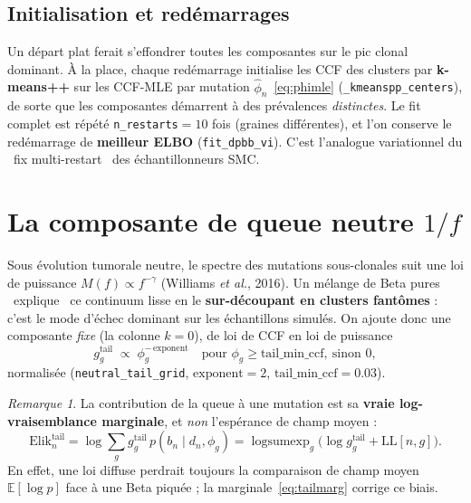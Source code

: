\documentclass[11pt,a4paper]{article}
\providecommand{\og}{\guillemotleft~}
\providecommand{\fg}{~\guillemotright}
\newcommand{\E}{\mathbb{E}}
\newcommand{\lse}{\operatorname{logsumexp}}
\newcommand{\code}[1]{\texttt{#1}}
\theoremstyle{remark}
\newtheorem*{remarque}{Remarque}
\begin{document}
\subsection{Initialisation et redémarrages}\label{sec:init}

Un départ plat ferait s'effondrer toutes les composantes sur le pic clonal dominant. À la
place, chaque redémarrage initialise les CCF des clusters par \textbf{k-means++} sur les
CCF-MLE par mutation $\hat\phi_n$~\eqref{eq:phimle} (\code{\_kmeanspp\_centers}), de sorte que
les composantes démarrent à des prévalences \emph{distinctes}. Le fit complet est répété
\code{n\_restarts}$=10$ fois (graines différentes), et l'on conserve le redémarrage de
\textbf{meilleur ELBO} (\code{fit\_dpbb\_vi}). C'est l'analogue variationnel du \og{}fix
multi-restart\fg{} des échantillonneurs SMC.

\section{La composante de queue neutre $1/f$}

Sous évolution tumorale neutre, le spectre des mutations sous-clonales suit une loi de
puissance $M(f)\propto f^{-\gamma}$ (Williams \emph{et al.}, 2016). Un mélange de Beta pures
\og{}explique\fg{} ce continuum lisse en le \textbf{sur-découpant en clusters fantômes} :
c'est le mode d'échec dominant sur les échantillons simulés. On ajoute donc une composante
\emph{fixe} (la colonne $k=0$), de loi de CCF en loi de puissance
\begin{equation}\label{eq:tail}
g^{\mathrm{tail}}_g \;\propto\; \phi_g^{-\,\text{exponent}}\quad\text{pour }\phi_g\ge\text{tail\_min\_ccf},\ \text{sinon }0,
\end{equation}
normalisée (\code{neutral\_tail\_grid}, $\text{exponent}=2$, $\text{tail\_min\_ccf}=0.03$).

\begin{remarque}
La contribution de la queue à une mutation est sa \textbf{vraie log-vraisemblance
marginale}, et \emph{non} l'espérance de champ moyen :
\begin{equation}\label{eq:tailmarg}
\mathrm{Elik}^{\mathrm{tail}}_n=\log\sum_g g^{\mathrm{tail}}_g\,p(b_n\mid d_n,\phi_g)
=\lse_g\!\big(\log g^{\mathrm{tail}}_g+\mathrm{LL}[n,g]\big).
\end{equation}
En effet, une loi diffuse perdrait toujours la comparaison de champ moyen
$\E[\log p]$ face à une Beta piquée ; la marginale~\eqref{eq:tailmarg} corrige ce biais.
\end{remarque}
\end{document}
